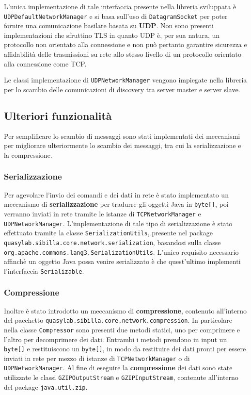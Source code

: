 L'unica implementazione di tale interfaccia presente nella libreria sviluppata è \texttt{UDPDefaultNetworkManager} e si basa sull'uso di \texttt{DatagramSocket} per poter fornire una comunicazione basilare basata su \textbf{UDP}.
Non sono presenti implementazioni che sfruttino TLS in quanto UDP è, per sua natura, un protocollo non orientato alla connessione e non può pertanto garantire sicurezza e affidabilità delle trasmissioni su rete allo stesso livello di un protocollo orientato alla connessione come TCP.

Le classi implementazione di \texttt{UDPNetworkManager} vengono impiegate nella libreria per lo scambio delle comunicazioni di discovery tra server master e server slave.


\subsection{Ulteriori funzionalità}

Per semplificare lo scambio di messaggi sono stati implementati dei meccanismi per migliorare ulteriormente lo scambio dei messaggi, tra cui la serializzazione e la compressione.

\subsubsection{Serializzazione}

Per agevolare l'invio dei comandi e dei dati in rete è stato implementato un meccanismo di \textbf{serializzazione} per tradurre gli oggetti Java in \texttt{byte[]}, poi verranno inviati in rete tramite le istanze di \texttt{TCPNetworkManager} e \texttt{UDPNetworkManager}. 
L'implementazione di tale tipo di serializzazione è stato effettuato tramite la classe \texttt{SerializationUtils}, presente nel package \texttt{quasylab.sibilla.core.network.serialization}, basandosi sulla classe \texttt{org.apache.commons.lang3.SerializationUtils}.
L'unico requisito necessario affinchè un oggetto Java possa venire serializzato è che quest'ultimo implementi l'interfaccia \texttt{Serializable}.

\subsubsection{Compressione}

Inoltre è stato introdotto un meccanismo di \textbf{compressione}, contenuto all'interno del pacchetto \texttt{quasylab.sibilla.core.network.compression}. In particolare nella classe \texttt{Compressor} sono presenti due metodi statici, uno per comprimere e l'altro per decomprimere dei dati. Entrambi i metodi prendono in input un \texttt{byte[]} e restituiscono un \texttt{byte[]}, in modo da restituire dei dati pronti per essere inviati in rete per mezzo di istanze di \texttt{TCPNetworkManager} o di \texttt{UDPNetworkManager}. Al fine di eseguire la \textbf{compressione} dei dati sono state utilizzate le classi \texttt{GZIPOutputStream} e \texttt{GZIPInputStream}, contenute all'interno del package \texttt{java.util.zip}.

